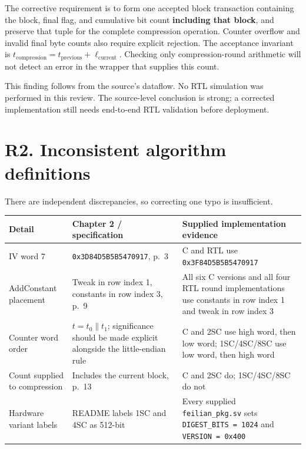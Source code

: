\documentclass[
  english,
  11pt,
  a4paper,
]{article}
\newcounter{none} %
\begin{document}
The corrective requirement is to form one accepted block transaction
containing the block, final flag, and cumulative bit count
\textbf{including that block}, and preserve that tuple for the complete
compression operation. Counter overflow and invalid final byte counts
also require explicit rejection. The acceptance invariant is
\(t_{\mathrm{compression}}=t_{\mathrm{previous}}+\ell_{\mathrm{current}}\).
Checking only compression-round arithmetic will not detect an error in
the wrapper that supplies this count.

This finding follows from the source's dataflow. No RTL simulation was
performed in this review. The source-level conclusion is strong; a
corrected implementation still needs end-to-end RTL validation before
deployment.


\section{R2. Inconsistent algorithm
definitions}\label{r2.-inconsistent-algorithm-definitions}

There are independent discrepancies, so correcting one typo is
insufficient.


{\def\LTcaptype{none} %
\begin{longtable}[]{@{}
  >{\raggedright\arraybackslash}p{}
  >{\raggedright\arraybackslash}p{}
  >{\raggedright\arraybackslash}p{}@{}}
\toprule\noalign{}
\begin{minipage}[b]{\linewidth}\raggedright
Detail
\end{minipage} & \begin{minipage}[b]{\linewidth}\raggedright
Chapter 2 / specification
\end{minipage} & \begin{minipage}[b]{\linewidth}\raggedright
Supplied implementation evidence
\end{minipage} \\
\midrule\noalign{}
\endhead
\bottomrule\noalign{}
\endlastfoot
IV word 7 & \texttt{0x3D84D5B5B5470917}, p.~3 & C and RTL use
\texttt{0x3F84D5B5B5470917} \\
AddConstant placement & Tweak in row index 1, constants in row index 3,
p.~9 & All six C versions and all four RTL round implementations use
constants in row index 1 and tweak in row index 3 \\
Counter word order & \(t=t_0\mathbin{\|}t_1\); significance should be
made explicit alongside the little-endian rule & C and 2SC use high
word, then low word; 1SC/4SC/8SC use low word, then high word \\
Count supplied to compression & Includes the current block, p.~13 & C
and 2SC do; 1SC/4SC/8SC do not \\
Hardware variant labels & README labels 1SC and 4SC as 512-bit & Every
supplied \texttt{feilian\_pkg.sv} sets \texttt{DIGEST\_BITS\ =\ 1024}
and \texttt{VERSION\ =\ 0x400} \\
\end{longtable}
}
\end{document}

